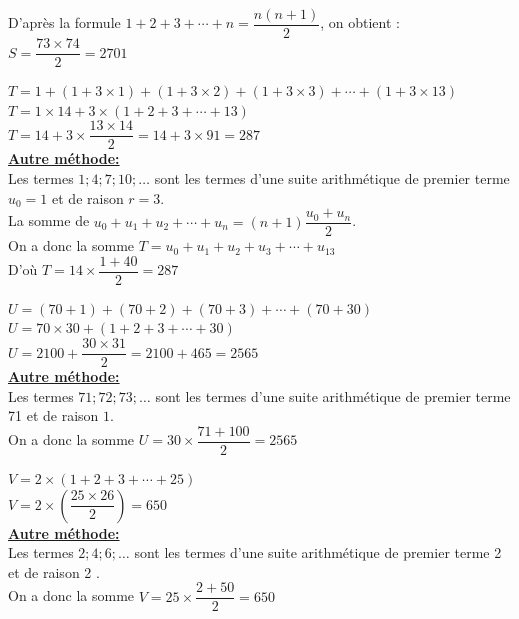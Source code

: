 \documentclass[a4paper,french]{book}
\begin{document}
\begin{enumMet}
    \item D'après la formule $1+2+3+\cdots+n=\dfrac{n(n+1)}{2}$, on obtient :\\
    $S=\dfrac{73 \times 74}{2}=2701$
    \item $T=1+(1+3 \times 1)+(1+3 \times 2)+(1+3 \times 3)+\cdots+(1+3 \times 13)$\\
    $T=1 \times 14+3 \times(1+2+3+\cdots+13)$\\
    $T=14+3 \times \dfrac{13 \times 14}{2}=14+3 \times 91=287$\\
    \underline{\textbf{Autre méthode:}}\\
    Les termes $1 ; 4 ; 7 ; 10 ; \ldots$ sont les termes d'une suite arithmétique de premier terme $u_{0}=1$ et de raison $r=3$.\\
    La somme de $u_{0}+u_{1}+u_{2}+\cdots+u_{n}=(n+1) \dfrac{u_{0}+u_{n}}{2}$.\\
    On a donc la somme $T=u_{0}+u_{1}+u_{2}+u_{3}+\cdots+u_{13}$\\
    D'où $T=14 \times \dfrac{1+40}{2}=287$
    \item $U=(70+1)+(70+2)+(70+3)+\cdots+(70+30)$\\
    $U=70 \times 30+(1+2+3+\cdots+30)$\\
    $U=2100+\dfrac{30 \times 31}{2}=2100+465=2565$\\
    \underline{\textbf{Autre méthode:}}\\
    Les termes $71 ; 72 ; 73 ; \ldots$ sont les termes d'une suite arithmétique de premier terme 71 et de raison $1$.\\
    On a donc la somme $U=30 \times \dfrac{71+100}{2}=2565$
    \item $V=2 \times(1+2+3+\cdots+25)$\\
    $V=2 \times\left(\dfrac{25 \times 26}{2}\right)=650$\\
    \underline{\textbf{Autre méthode:}}\\
    Les termes $2 ; 4 ; 6 ; \ldots$ sont les termes d'une suite arithmétique de premier terme 2 et de raison 2 .\\
    On a donc la somme $V=25 \times \dfrac{2+50}{2}=650$
\end{enumMet}
\end{document}
